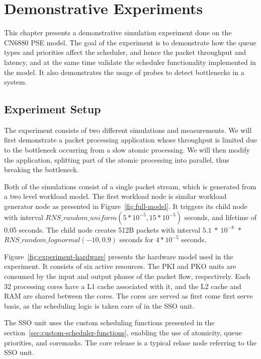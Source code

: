 \chapter{Demonstrative Experiments}
\label{chapter:demonstrative-experiments}

This chapter presents a demonstrative simulation experiment done on the CN6880 PSE model. The goal of the experiment is to demonstrate how the queue types and priorities affect the scheduler, and hence the packet throughput and latency, and at the same time validate the scheduler functionality implemented in the model. It also demonstrates the usage of probes to detect bottlenecks in a system.

\section{Experiment Setup}
\label{sec:experiment-setup}

The experiment consists of two different simulations and measurements. We will first demonstrate a packet processing application whose throughput is limited due to the bottleneck occurring from a slow atomic processing. We will then modify the application, splitting part of the atomic processing into parallel, thus breaking the bottleneck.

Both of the simulations consist of a single packet stream, which is generated from a two level workload model. The first workload node is similar workload generator node as presented in Figure~\ref{fig:full-model}. It triggers its child node with interval $RNS\_random\_uniform(5*10^{-5}, 15*10^{-5})$ seconds, and lifetime of 0.05 seconds. The child node creates 512B packets with interval $5.1~*~10^{-8}$~$*$~$RNS\_random\_lognormal(-10, 0.9)$ seconds for $4*10^{-5}$ seconds.

Figure~\ref{fig:experiment-hardware} presents the hardware model used in the experiment. It consists of six active resources. The PKI and PKO units are consumed by the input and output phases of the packet flow, respectively. Each 32 processing cores have a L1 cache associated with it, and the L2 cache and RAM are shared between the cores. The cores are served as first come first serve basis, as the scheduling logic is taken care of in the SSO unit.

The SSO unit uses the custom scheduling functions presented in the section~\ref{sec:custom-scheduler-functions}, enabling the use of atomicity, queue priorities, and coremasks. The core release is a typical relase node referring to the SSO unit.


